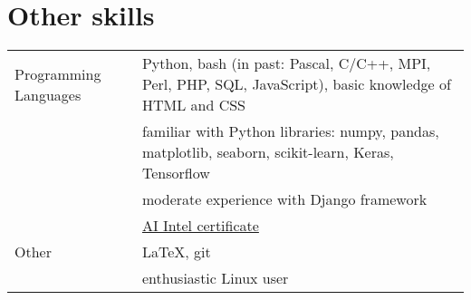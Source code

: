 \documentclass[a4paper, oneside, final]{scrartcl} %
\newcommand{\gray}{\rowcolor[gray]{.90}} %
\begin{document}
\section{Other skills}
\begin{tabularx}{0.97\linewidth}{>{\raggedleft}p{2.5cm}X}
  \gray  Programming Languages &  Python, bash (in past: Pascal, C/C++, MPI, Perl, PHP, SQL, JavaScript),
   basic knowledge of HTML and CSS\\
   & familiar with Python libraries: numpy, pandas, matplotlib, seaborn, scikit-learn,
   Keras, Tensorflow\\
   & moderate experience with Django framework \\
   & \href{http://www.cs.cas.cz/~petra/cv/cert/certificate_intel.pdf}{AI Intel certificate}\\
\gray  Other & LaTeX, git \\
\gray   & enthusiastic Linux user \\
\end{tabularx}


\end{document}
